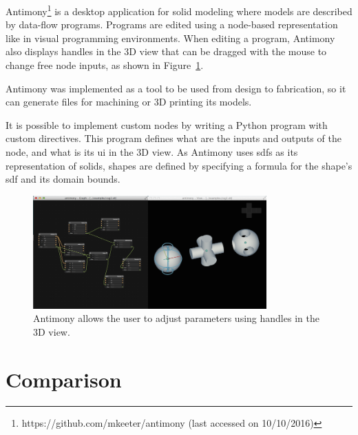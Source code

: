 Antimony\footnote{https://github.com/mkeeter/antimony (last accessed on 10/10/2016)} is a desktop application for solid modeling where models are described by data-flow programs.
Programs are edited using a node-based representation like in visual programming environments.
When editing a program, Antimony also displays handles in the 3D view that can be dragged with the mouse to change free node inputs, as shown in Figure~\ref{fig:antimony:handles}.

Antimony was implemented as a tool to be used from design to fabrication, so it can generate files for machining or 3D printing its models.

It is possible to implement custom nodes by writing a Python program with custom directives.
This program defines what are the inputs and outputs of the node, and what is its \gls{ui} in the 3D view.
As Antimony uses \glspl{sdf} as its representation of solids, shapes are defined by specifying a formula for the shape's \gls{sdf} and its domain bounds.

\begin{figure}
	\centering
	\includegraphics[width=0.8\textwidth]{images/antimony_ui_handles}
	\caption{Antimony allows the user to adjust parameters using handles in the 3D view.}
	\label{fig:antimony:handles}
\end{figure}


\section{Comparison}


